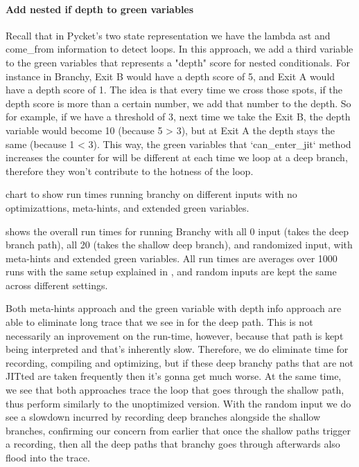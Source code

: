     \begin{paragraph-here}%
      \paragraph{Add nested if depth to green variables} Recall that in Pycket's two state representation we have the lambda ast and come\_from information to detect loops. In this approach, we add a third variable to the green variables that represents a "depth" score for nested conditionals. For instance in Branchy, Exit B would have a depth score of 5, and Exit A would have a depth score of 1. The idea is that every time we cross those spots, if the depth score is more than a certain number, we add that number to the depth. So for example, if we have a threshold of 3, next time we take the Exit B, the depth variable would become 10 (because 5 > 3), but at Exit A the depth stays the same (because 1 < 3). This way, the green variables that `can\_enter\_jit` method increases the counter for will be different at each time we loop at a deep branch, therefore they won't contribute to the hotness of the loop.
    \end{paragraph-here}

    \begin{figure-here}
      chart to show run times running branchy on different inputs with no optimizattions, meta-hints, and extended green variables.
    \end{figure-here}

    \begin{paragraph-here}%
      \figref{} shows the overall run times for running Branchy with all 0 input (takes the deep branch path), all 20 (takes the shallow deep branch), and randomized input, with meta-hints and extended green variables. All run times are averages over 1000 runs with the same setup explained in , and random inputs are kept the same across different settings.
    \end{paragraph-here}

    \begin{paragraph-here}%
      Both meta-hints approach and the green variable with depth info approach are able to eliminate long trace that we see in  for the deep path. This is not necessarily an inprovement on the run-time, however, because that path is kept being interpreted and that's inherently slow. Therefore, we do eliminate time for recording, compiling and optimizing, but if these deep branchy paths that are not JITted are taken frequently then it's gonna get much worse. At the same time, we see that both approaches trace the loop that goes through the shallow path, thus perform similarly to the unoptimized version. With the random input we do see a slowdown incurred by recording deep branches alongside the shallow branches, confirming our concern from earlier that once the shallow paths trigger a recording, then all the deep paths that branchy goes through afterwards also flood into the trace.
    \end{paragraph-here}

